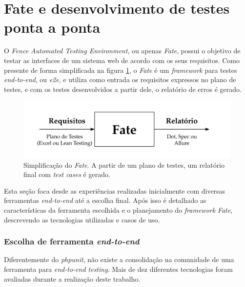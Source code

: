 \hypertarget{fence-automated-testing-environment}{%
\section{Fate e desenvolvimento de testes ponta a ponta}\label{fence-automated-testing-environment}}

O \emph{Fence Automated Testing Environment}, ou apenas \emph{Fate}, possui o objetivo de testar as interfaces de um sistema web de acordo com os seus requisitos. Como presente de forma simplificada na figura \ref{fig:fate-esq}, o \emph{Fate} é um \emph{framework} para testes \emph{end-to-end}, ou \emph{e2e}, e utiliza como entrada os requisitos expressos no plano de testes, e com os testes desenvolvidos a partir dele, o relatório de erros é gerado.

\begin{figure}[H]
    \centering
    \includegraphics[width=13cm]{source/4-solucao/images/fate-esq.png}
    \caption{Simplificação do \emph{Fate}. A partir de um plano de testes, um relatório final com \emph{test cases} é gerado.}
    \label{fig:fate-esq}
\end{figure}

Esta seção foca desde as experiências realizadas inicialmente com diversas ferramentas \emph{end-to-end} até a escolha final. Após isso é detalhado as características da ferramenta escolhida e o planejamento do \emph{framework} \emph{Fate}, descrevendo as tecnologias utilizadas e casos de uso.

\hypertarget{escolha-de-ferramenta-e2e}{%
\subsubsection{\texorpdfstring{Escolha de ferramenta \emph{end-to-end}}{Escolha de ferramenta e2e}}\label{escolha-de-ferramenta-e2e}}

Diferentemente do \emph{phpunit}, não existe a consolidação na comunidade de uma ferramenta para \emph{end-to-end testing}. Mais de dez diferentes tecnologias foram avaliadas durante a realização deste trabalho.

